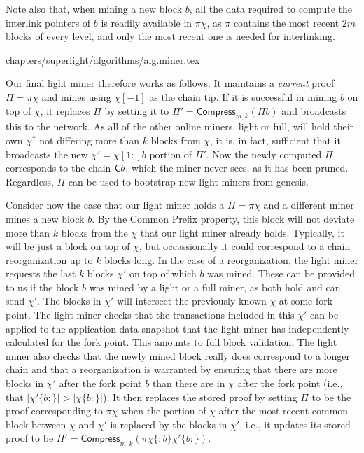 Note also that, when mining a new block $b$, all the data required to compute
the interlink pointers of $b$ is readily available in $\pi\chi$, as $\pi$
contains the most recent $2m$ blocks of every level, and only the most recent
one is needed for interlinking.

{chapters/superlight/algorithms/alg.miner.tex}

Our final light miner therefore works as follows. It maintains a \emph{current} proof
$\Pi = \pi\chi$ and mines using $\chi[-1]$ as the chain tip. If it is successful
in mining $b$ on top of $\chi$, it replaces $\Pi$ by setting it to
$\Pi' = \textsf{Compress}_{m,k}(\Pi b)$ and broadcasts this to the network.
As all of the other online miners, light or full, will hold their own $\chi^*$
not differing more than $k$ blocks from $\chi$, it is, in fact, sufficient that it broadcasts
the new $\chi' = \chi[1{:}] b$ portion of $\Pi'$. Now the newly computed $\Pi$ corresponds
to the chain $\mathsf{C} b$, which the miner never sees, as it has been pruned.
Regardless, $\Pi$ can be used to bootstrap new light miners from genesis.

Consider now the case that our light miner holds a $\Pi = \pi\chi$ and a different
miner mines a new block $b$. By the Common Prefix property, this block will
not deviate more than $k$ blocks from the $\chi$ that our light miner already
holds. Typically, it will be just a block on top of $\chi$, but occassionally
it could correspond to a chain reorganization up to $k$ blocks long. In the case of a reorganization,
the light miner requests the last $k$ blocks $\chi'$ on top of which $b$ was mined.
These can be provided to us if the block $b$ was mined by a light
or a full miner, as both hold and can send $\chi'$.
The blocks in $\chi'$ will intersect the previously known $\chi$ at some
fork point. The light miner checks that the transactions included in this
$\chi'$ can be applied to the application data snapshot that the light
miner has independently calculated for the fork point. This amounts to
full block validation. The light miner also checks that the newly mined
block really does correspond to a longer chain and that a reorganization is warranted
by ensuring that there are more blocks in $\chi'$ after the fork point $b$ than
there are in $\chi$ after the fork point
(i.e., that $|\chi'\{b{:}\}| > |\chi\{b{:}\}|$).
It then replaces the stored proof by setting $\Pi$ to be the proof corresponding
to $\pi\chi$ when the portion of $\chi$ after the most recent common
block between $\chi$ and $\chi'$ is replaced by the blocks in $\chi'$, i.e.,
it updates its stored proof to be
$\Pi' = \textsf{Compress}_{m,k}(\pi \chi\{{:}b\} \chi'\{b{:}\})$.

